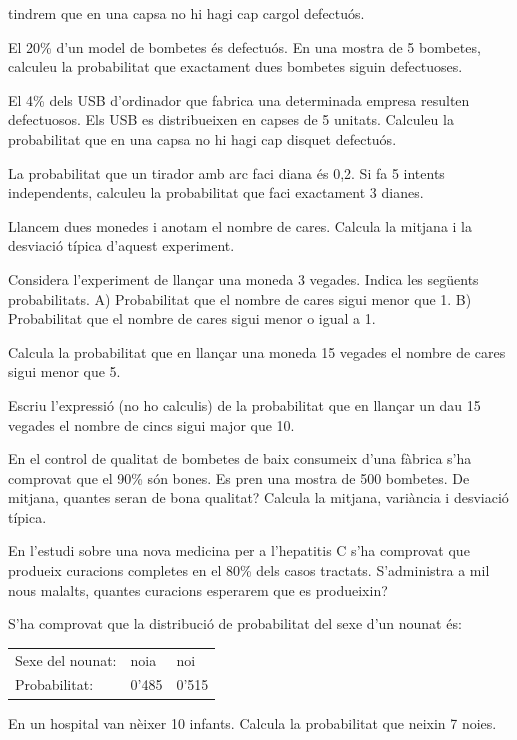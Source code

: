 \begin{mylist}
	tindrem que en una capsa no hi hagi cap cargol defectuós. 
	\item
	El 20\% d'un model de bombetes és defectuós. En una mostra de 5
	bombetes, calculeu la probabilitat que exactament dues bombetes siguin
	defectuoses. 
	\item
	El 4\% dels USB d'ordinador que fabrica una determinada empresa
	resulten defectuosos. Els USB es distribueixen en capses de 5 unitats.
	Calculeu la probabilitat que en una capsa no hi hagi cap disquet
	defectuós. 
	\item
	La probabilitat que un tirador amb arc faci diana és 0,2. Si fa 5
	intents independents, calculeu la probabilitat que faci exactament 3
	dianes. 
	\item
	Llancem dues monedes i anotam el nombre de cares. Calcula la mitjana i
	la desviació típica d'aquest experiment.
	\item
	Considera l'experiment de llançar una moneda 3 vegades. Indica les
	següents probabilitats. A) Probabilitat que el nombre de cares sigui
	menor que 1. B) Probabilitat que el nombre de cares sigui menor o
	igual a 1. 
	\item
	Calcula la probabilitat que en llançar una moneda 15 vegades el nombre
	de cares sigui menor que 5.
	\item
	Escriu l'expressió (no ho calculis) de la probabilitat que en llançar
	un dau 15 vegades el nombre de cincs sigui major que 10.
	\item
	En el control de qualitat de bombetes de baix consumeix d'una fàbrica
	s'ha comprovat que el 90\% són bones. Es pren una mostra de 500
	bombetes. De mitjana, quantes seran de bona qualitat? Calcula la
	mitjana, variància i desviació típica. 
	\item
	En l'estudi sobre una nova medicina per a l'hepatitis C s'ha comprovat
	que produeix curacions completes en el 80\% dels casos tractats.
	S'administra a mil nous malalts, quantes curacions esperarem que es
	produeixin?
	\item
	S'ha comprovat que la distribució de probabilitat del sexe d'un nounat
	és:
	
	
	\begin{longtable}[]{@{}lll@{}}
		\toprule
		Sexe del nounat: & noia & noi\tabularnewline
		Probabilitat: & 0'485 & 0'515\tabularnewline
		\bottomrule
	\end{longtable}
	En un hospital van nèixer 10 infants. Calcula la probabilitat que neixin 7 noies.
	
\end{mylist}

